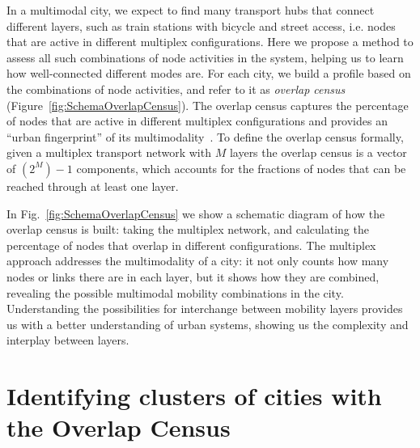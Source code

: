 In a multimodal city, we expect to find many transport hubs that connect different layers, such as train stations with bicycle and street access, i.e. nodes that are active in different multiplex configurations. Here we propose a method to assess all such combinations of node activities in the system, helping us to learn how well-connected different modes are. For each city, we build a profile based on the combinations of node activities, and refer to it as \emph{overlap census} (Figure~\ref{fig:SchemaOverlapCensus}). The overlap census captures the percentage of nodes that are active in different multiplex configurations and provides an ``urban fingerprint'' of its multimodality~\cite{Aleta2017Multilayer}. To define the overlap census formally, given a multiplex transport network with $M$ layers the overlap census is a vector of $(2^M)-1$ components, which accounts for the fractions of nodes that can be reached through at least one layer.

In Fig.~\ref{fig:SchemaOverlapCensus} we show a schematic diagram of how the overlap census is built: taking the multiplex network, and calculating the percentage of nodes that overlap in different configurations. The multiplex approach addresses the multimodality of a city: it not only counts how many nodes or links there are in each layer, but it shows how they are combined, revealing the possible multimodal mobility combinations in the city. Understanding the possibilities for interchange between mobility layers provides us with a better understanding of urban systems, showing us the complexity and interplay between layers.


\section{Identifying clusters of cities with the Overlap Census}


